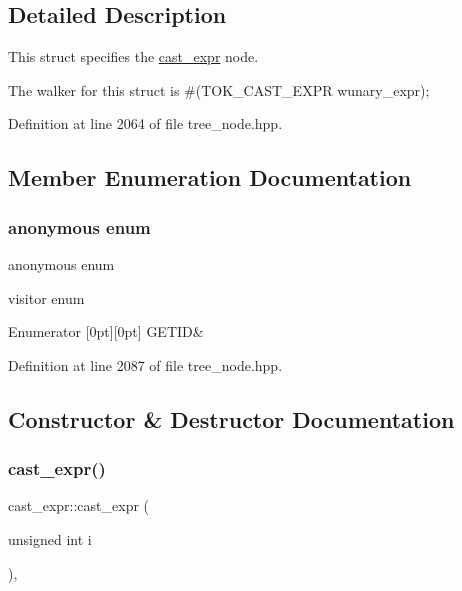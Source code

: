 \subsection{Detailed Description}
This struct specifies the \hyperlink{structcast__expr}{cast\+\_\+expr} node. 

The walker for this struct is \#(T\+O\+K\+\_\+\+C\+A\+S\+T\+\_\+\+E\+X\+PR wunary\+\_\+expr); 

Definition at line 2064 of file tree\+\_\+node.\+hpp.



\subsection{Member Enumeration Documentation}
\mbox{\label{structcast__expr_aef99e977b5cf66f799bad8db6c622681}} 
\subsubsection{\texorpdfstring{anonymous enum}{anonymous enum}}
{\footnotesize\ttfamily anonymous enum}



visitor enum 

\begin{DoxyEnumFields}{Enumerator}
[0pt][0pt]{}\mbox{\label{structcast__expr_aef99e977b5cf66f799bad8db6c622681a16bf48fe336bba424560dec3e8ff4502}} 
G\+E\+T\+ID&\\
\hline

\end{DoxyEnumFields}


Definition at line 2087 of file tree\+\_\+node.\+hpp.



\subsection{Constructor \& Destructor Documentation}
\mbox{\label{structcast__expr_a60607b1dde6f6ed9e126b16910768dd4}} 
\subsubsection{\texorpdfstring{cast\+\_\+expr()}{cast\_expr()}}
{\footnotesize\ttfamily cast\+\_\+expr\+::cast\+\_\+expr (\begin{DoxyParamCaption}\item[{unsigned int}]{i }\end{DoxyParamCaption})\hspace{0.3cm}{\ttfamily [inline]}, {\ttfamily [explicit]}}



